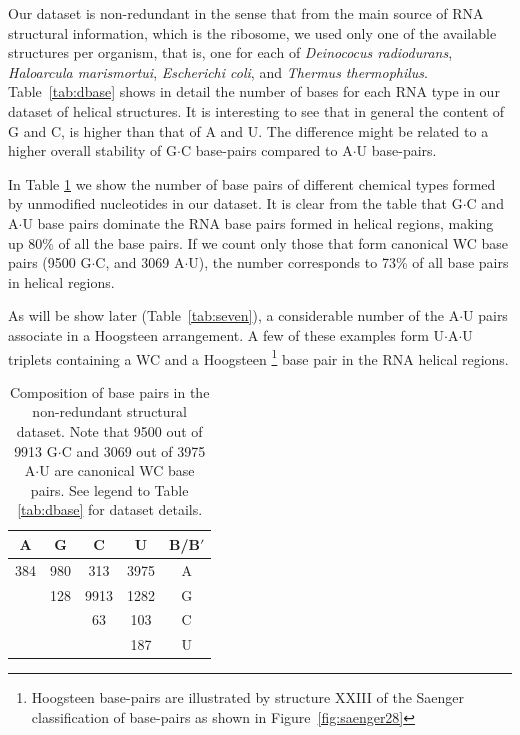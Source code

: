 Our dataset is non-redundant in the sense that from the main source of
RNA structural information, which is the ribosome, we used only one of
the  available structures  per  organism,  that is,  one  for each  of
\textit{Deinococus   radiodurans},   \textit{Haloarcula  marismortui},
\textit{Escherichi          coli},         and         \textit{Thermus
  thermophilus}. Table~\ref{tab:dbase}  shows in detail  the number of
bases for each  RNA type in our dataset of  helical structures.  It is
interesting to see  that in general the content of G  and C, is higher
than that  of A  and U. The  difference might  be related to  a higher
overall  stability  of  G$\cdot$C  base-pairs  compared  to  A$\cdot$U
base-pairs.

In Table \ref{tab:bpcomp} we show the number of base pairs of
different  chemical  types formed  by  unmodified  nucleotides in  our
dataset.  It is  clear from  the  table that  G$\cdot$C and  A$\cdot$U
base pairs dominate the RNA base pairs formed in helical regions,
making up 80\% of all the base pairs. If we count only those that form
canonical WC base pairs (9500 G$\cdot$C, and 3069 A$\cdot$U), the
number corresponds to 73\% of all base pairs in helical regions.

As will  be show later (Table~\ref{tab:seven}),  a considerable number
of the A$\cdot$U  pairs associate in a Hoogsteen  arrangement. A few
of these examples form  U$\cdot$A$\cdot$U triplets containing a WC and
a   Hoogsteen  \footnote{Hoogsteen   base-pairs  are   illustrated  by
  structure XXIII of the Saenger classification of base-pairs as shown
  in Figure~\ref{fig:saenger28}} base pair in the RNA helical regions.

\begin{table}[htbp]
\begin{center}
\begin{tabular}{|c|c|c|c|c|}
\hline
A    &      G    &      C    &      U    &      B/B$'$ \\ \hline
384  &    980    &    313    &   3975    &      A  \\ \hline
     &    128    &   9913    &   1282    &      G  \\ \hline
     &           &     63    &    103    &      C  \\ \hline
     &           &           &    187    &      U  \\ \hline
\end{tabular}
\caption{Composition  of base  pairs in  the  non-redundant structural
  dataset. Note that 9500 out of 9913 G$\cdot$C and 3069
  out of  3975 A$\cdot$U  are canonical WC  base pairs. See  legend to
  Table \ref{tab:dbase} for dataset details.}
\label{tab:bpcomp}
\end{center}
\end{table}


